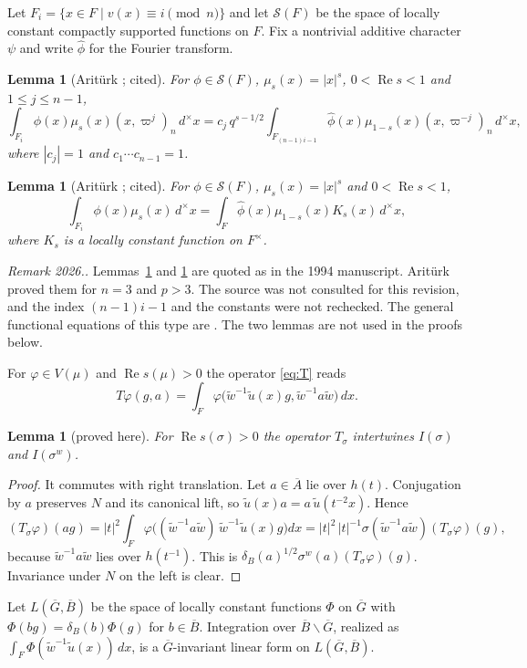 \documentclass[12pt,letterpaper]{article}
\numberwithin{equation}{section}
\newtheorem{lemma}[theorem]{Lemma}
\theoremstyle{definition}
\newcounter{rmk}
\newcommand{\unverified}[1]{\refstepcounter{rmk}\par\smallskip\noindent\textit{Remark 2026.\arabic{rmk}.} #1\par\smallskip}
\newcommand{\proved}{proved here}
\newcommand{\cited}{cited}
\newcommand{\vp}{\varpi}
\newcommand{\bG}{\overline{G}}
\newcommand{\bA}{\overline{A}}
\newcommand{\bB}{\overline{B}}
\newcommand{\wt}{\tilde w}
\newcommand{\ul}{\tilde u}
\DeclareMathOperator{\re}{Re}
\begin{document}
Let $F_i=\{x\in F\mid v(x)\equiv i\pmod n\}$ and let $\mathcal S(F)$ be the space of locally
constant compactly supported functions on $F$.  Fix a nontrivial additive character
$\psi$ and write $\widehat\phi$ for the Fourier transform.

\begin{lemma}[Arit\"urk {\cite[Lemma~3.1]{Ar80}}; \cited]\label{lem:ariturk1}
For $\phi\in\mathcal S(F)$, $\mu_s(x)=|x|^s$, $0<\re s<1$ and $1\le j\le n-1$,
\[
\int_{F_i}\phi(x)\mu_s(x)(x,\vp^j)_n\,d^\times x
=c_j\,q^{s-1/2}\int_{F_{(n-1)i-1}}\widehat\phi(x)\mu_{1-s}(x)(x,\vp^{-j})_n\,d^\times x,
\]
where $|c_j|=1$ and $c_1\cdots c_{n-1}=1$.
\end{lemma}

\begin{lemma}[Arit\"urk \cite{Ar80}; \cited]\label{lem:ariturk2}
For $\phi\in\mathcal S(F)$, $\mu_s(x)=|x|^s$ and $0<\re s<1$,
\[
\int_{F_i}\phi(x)\mu_s(x)\,d^\times x=\int_F\widehat\phi(x)\mu_{1-s}(x)K_s(x)\,d^\times x,
\]
where $K_s$ is a locally constant function on $F^\times$.
\end{lemma}
\unverified{Lemmas~\ref{lem:ariturk1} and \ref{lem:ariturk2} are quoted as in the 1994
manuscript.  Arit\"urk proved them for $n=3$ and $p>3$.  The source was not consulted for
this revision, and the index $(n-1)i-1$ and the constants were not rechecked.  The general
functional equations of this type are \cite[Theorems~2.1 and 2.2]{GS16}.  The two lemmas
are not used in the proofs below.}

For $\varphi\in V(\mu)$ and $\re s(\mu)>0$ the operator \eqref{eq:T} reads
\[
T\varphi(g,a)=\int_F\varphi\bigl(\wt^{-1}\ul(x)g,\wt^{-1}a\wt\bigr)\,dx .
\]

\begin{lemma}[\proved]\label{lem:T-intertwines}
For $\re s(\sigma)>0$ the operator $T_\sigma$ intertwines $I(\sigma)$ and $I(\sigma^w)$.
\end{lemma}
\begin{proof}
It commutes with right translation.  Let $a\in\bA$ lie over $h(t)$.  Conjugation by $a$
preserves $N$ and its canonical lift, so $\ul(x)a=a\,\ul(t^{-2}x)$.  Hence
\[
(T_\sigma\varphi)(ag)=|t|^2\!\int_F\varphi\bigl((\wt^{-1}a\wt)\,\wt^{-1}\ul(x)g\bigr)dx
=|t|^2\,|t|^{-1}\sigma(\wt^{-1}a\wt)(T_\sigma\varphi)(g),
\]
because $\wt^{-1}a\wt$ lies over $h(t^{-1})$.  This is
$\delta_B(a)^{1/2}\sigma^w(a)(T_\sigma\varphi)(g)$.  Invariance under $N$ on the left is
clear.
\end{proof}

Let $L(\bG,\bB)$ be the space of locally constant functions $\Phi$ on $\bG$ with
$\Phi(b g)=\delta_B(b)\Phi(g)$ for $b\in\bB$.  Integration over $\bB\backslash\bG$, realized
as $\int_F\Phi(\wt^{-1}\ul(x))\,dx$, is a $\bG$-invariant linear form on $L(\bG,\bB)$.
\end{document}
